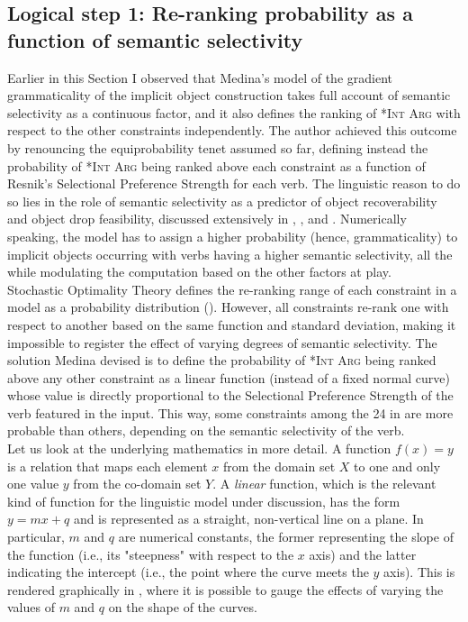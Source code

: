 \subsection{Logical step 1: Re-ranking probability as a function of semantic selectivity} Earlier in this Section I observed that Medina's model of the gradient grammaticality of the implicit object construction takes full account of semantic selectivity as a continuous factor, and it also defines the ranking of \textsc{*Int Arg} with respect to the other constraints independently. The author achieved this outcome by renouncing the equiprobability tenet assumed so far, defining instead the probability of \textsc{*Int Arg} being ranked above each constraint as a function of Resnik's Selectional Preference Strength \parencite{Resnik1993,Resnik1996} for each verb. The linguistic reason to do so lies in the role of semantic selectivity as a predictor of object recoverability and object drop feasibility, discussed extensively in , , and . Numerically speaking, the model has to assign a higher probability (hence, grammaticality) to implicit objects occurring with verbs having a higher semantic selectivity, all the while modulating the computation based on the other factors at play.\\
Stochastic Optimality Theory defines the re-ranking range of each constraint in a model as a probability distribution (). However, all constraints re-rank one with respect to another based on the same function and standard deviation, making it impossible to register the effect of varying degrees of semantic selectivity. The solution Medina devised \parencite[94]{Medina2007} is to define the
probability of \textsc{*Int Arg} being ranked above any other constraint as a linear function (instead of a fixed normal curve) whose value is directly proportional to the Selectional Preference Strength of the verb featured in the input. This way, some constraints among the 24 in  are more probable than others, depending on the semantic selectivity of the verb.\\
Let us look at the underlying mathematics in more detail. A function $f(x) = y$ is a relation that maps each element $x$ from the domain set $X$ to one and only one value $y$ from the co-domain set $Y$. A \textit{linear} function, which is the relevant kind of function for the linguistic model under discussion, has the form $y = mx + q$ and is represented as a straight, non-vertical line on a plane. In particular, $m$ and $q$ are numerical constants, the former representing the slope of the function (i.e., its "steepness" with respect to the $x$ axis) and the latter indicating the intercept (i.e., the point where the curve meets the $y$ axis). This is rendered graphically in , where it is possible to gauge the effects of varying the values of $m$ and $q$ on the shape of the curves.

